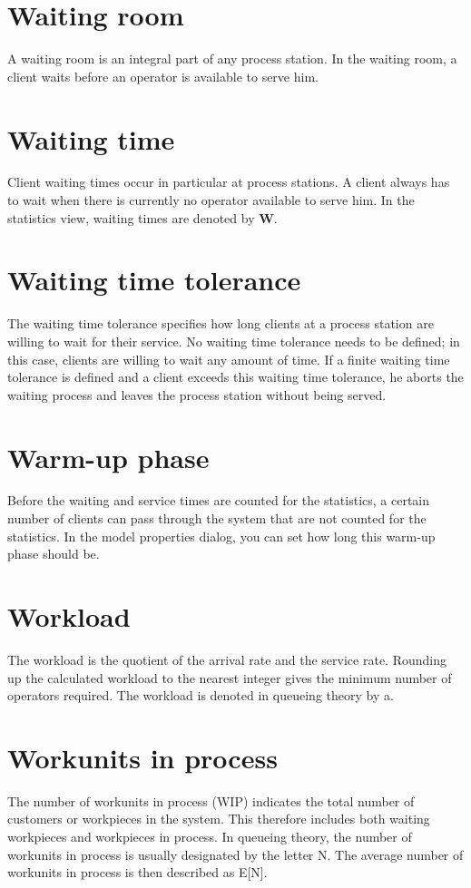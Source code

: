 \section*{Waiting room}


A waiting room is an integral part of any process station.
In the waiting room, a client waits before an operator is available to serve him.

\section*{Waiting time}


Client waiting times occur in particular at process stations.
A client always has to wait when there is currently no operator available to serve him.
In the statistics view, waiting times are denoted by \textbf{W}.

\section*{Waiting time tolerance}


The waiting time tolerance specifies how long clients at a process station
are willing to wait for their service. No waiting time tolerance needs to be defined; in this case, clients are
willing to wait any amount of time. If a finite waiting time tolerance is defined and a client exceeds this
waiting time tolerance, he aborts the waiting process and leaves the process station without being served.

\section*{Warm-up phase}


Before the waiting and service times are counted for the statistics, a certain number of clients can pass through
the system that are not counted for the statistics. In the model properties dialog,
you can set how long this warm-up phase should be.

\section*{Workload}


The workload is the quotient of the arrival rate and the service rate. Rounding up the calculated workload
to the nearest integer gives the minimum number of operators required. The workload is denoted
in queueing theory by a.

\section*{Workunits in process}


The number of workunits in process (WIP) indicates the total number of customers or workpieces in the system.
This therefore includes both waiting workpieces and workpieces in process.
In queueing theory, the number of workunits in process is usually designated by the letter N.
The average number of workunits in process is then described as E[N].